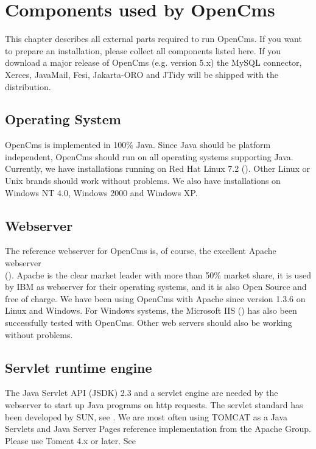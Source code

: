 \chapter{Components used by OpenCms}
\label{components}

This chapter describes all external parts required to run OpenCms.
If you want to prepare an installation, please collect all
components listed here. If you download a major release of OpenCms
(e.g. version 5.x) the MySQL connector, Xerces, JavaMail, Fesi, 
Jakarta-ORO and JTidy will be shipped with the distribution.

\section{Operating System}
OpenCms is implemented in 100\% Java. Since Java should be platform independent, OpenCms should run
on all operating systems supporting Java. Currently, we have installations running on
Red Hat Linux 7.2 (). Other
Linux or Unix brands should work without problems. We also have installations on
Windows NT 4.0, Windows 2000 and Windows XP.

\section{Webserver}
The reference webserver for OpenCms is, of course, the excellent Apache webserver \\
().
Apache is the clear market leader with more than 50\% market share,
it is used by IBM as webserver for their operating systems, and it is also Open Source and
free of charge. We have been using OpenCms with Apache since version 1.3.6 on Linux and Windows.
For Windows systems, the Microsoft IIS ()
has also been successfully tested with OpenCms. 
Other web servers should also be working without problems.

\section{Servlet runtime engine}
The Java Servlet API (JSDK) 2.3 and a servlet engine are needed by
the webserver to start up Java programs on http requests. The
servlet standard has been developed by SUN, see
.
We are most often using TOMCAT as a Java Servlets and Java Server
Pages reference implementation from the Apache Group. Please use
Tomcat 4.x or later. See

